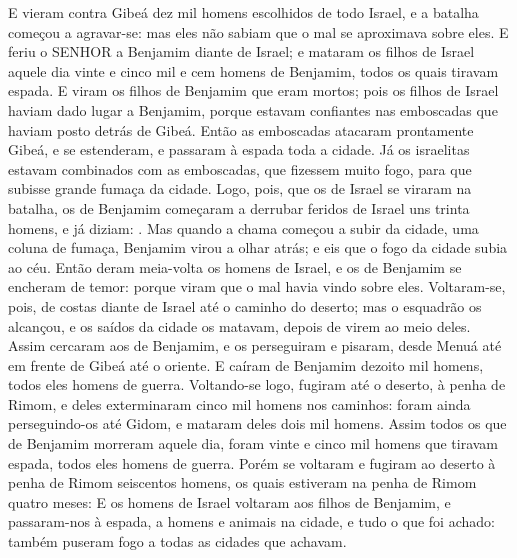 {  E vieram contra Gibeá dez mil homens escolhidos de todo Israel, e a batalha começou a agravar-se: mas eles não sabiam que o mal se aproximava sobre eles.
  E feriu o SENHOR a Benjamim diante de Israel; e mataram os filhos de Israel aquele dia vinte e cinco mil e cem homens de Benjamim, todos os quais tiravam espada.
  E viram os filhos de Benjamim que eram mortos; pois os filhos de Israel haviam dado lugar a Benjamim, porque estavam confiantes nas emboscadas que haviam posto detrás de Gibeá.
  Então as emboscadas atacaram prontamente Gibeá, e se estenderam, e passaram à espada toda a cidade.
  Já os israelitas estavam combinados com as emboscadas, que fizessem muito fogo, para que subisse grande fumaça da cidade.
  Logo, pois, que os de Israel se viraram na batalha, os de Benjamim começaram a derrubar feridos de Israel uns trinta homens, e já diziam: .
  Mas quando a chama começou a subir da cidade, uma coluna de fumaça, Benjamim virou a olhar atrás; e eis que o fogo da cidade subia ao céu.
  Então deram meia-volta os homens de Israel, e os de Benjamim se encheram de temor: porque viram que o mal havia vindo sobre eles.
  Voltaram-se, pois, de costas diante de Israel até o caminho do deserto; mas o esquadrão os alcançou, e os saídos da cidade os matavam, depois de virem ao meio deles.
  Assim cercaram aos de Benjamim, e os perseguiram e pisaram, desde Menuá até em frente de Gibeá até o oriente.
  E caíram de Benjamim dezoito mil homens, todos eles homens de guerra.
  Voltando-se logo, fugiram até o deserto, à penha de Rimom, e deles exterminaram cinco mil homens nos caminhos: foram ainda perseguindo-os até Gidom, e mataram deles dois mil homens.
  Assim todos os que de Benjamim morreram aquele dia, foram vinte e cinco mil homens que tiravam espada, todos eles homens de guerra.
  Porém se voltaram e fugiram ao deserto à penha de Rimom seiscentos homens, os quais estiveram na penha de Rimom quatro meses:
  E os homens de Israel voltaram aos filhos de Benjamim, e passaram-nos à espada, a homens e animais na cidade, e tudo o que foi achado: também puseram fogo a todas as cidades que achavam.
\par }

